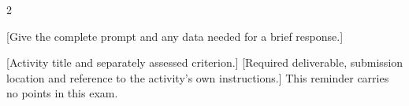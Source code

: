 \begin{multicols}{2}
\noindent\begin{minipage}{\linewidth}
[Give the complete prompt and any data needed for a brief response.]
\end{minipage}\par
\ifSeparateActivity
\noindent\begin{minipage}{\linewidth}
[Activity title and separately assessed criterion.] [Required deliverable,
submission location and reference to the activity's own instructions.]
This reminder carries no points in this exam.
\end{minipage}\par
\fi
\end{multicols}

